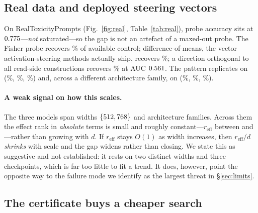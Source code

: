 \documentclass[11pt]{article}
\theoremstyle{definition}
\theoremstyle{remark}
\newcommand{\reff}{r_{\mathrm{eff}}}
\begin{document}
\subsection{Real data and deployed steering vectors}

On RealToxicityPrompts (Fig.~\ref{fig:real}, Table~\ref{tab:real}), probe
accuracy sits at $0.775$---\emph{not} saturated---so the gap is not an
artefact of a maxed-out probe. The Fisher probe recovers \EfiveFisherEff\% of
available control; difference-of-means, the vector activation-steering methods
actually ship, recovers \EfiveDomEff\%; a direction orthogonal to all read-side
constructions recovers \EfiveDarkEff\% at AUC $0.561$. The pattern
replicates on \EfiveSecond{} (\EfiveSecondFisherEff\%, \EfiveSecondDomEff\%,
\EfiveSecondDarkEff\%) and, across a different architecture family, on
\EfiveThirdName{} (\EfiveThirdFisherEff\%, \EfiveThirdDomEff\%,
\EfiveThirdDarkEff\%).

\paragraph{A weak signal on how this scales.}
The three models span widths $\{512, 768\}$ and \EfiveNfamilies{}
architecture families. Across them the effect rank in \emph{absolute} terms is
small and roughly constant---$\reff$ between \EfiveAbsReffMin{} and
\EfiveAbsReffMax---rather than growing with $d$. If $\reff$ stays $O(1)$ as
width increases, then $\reff/d$ \emph{shrinks} with scale and the gap widens
rather than closing. We state this as suggestive and not established: it rests
on two distinct widths and three checkpoints, which is far too little to fit a
trend. It does, however, point the opposite way to the failure mode we
identify as the largest threat in \S\ref{sec:limits}.

\begin{table}[t]
\centering
\small
\caption{RealToxicityPrompts, averaged over all layers. Efficiency is measured
effect relative to the certificate-optimal direction at equal write norm; KL is
the mean divergence of the next-token distribution under the same write. Rows
are generated from \texttt{results/data/}, not transcribed.}
\label{tab:real}

\end{table}

\subsection{The certificate buys a cheaper search}
\end{document}
